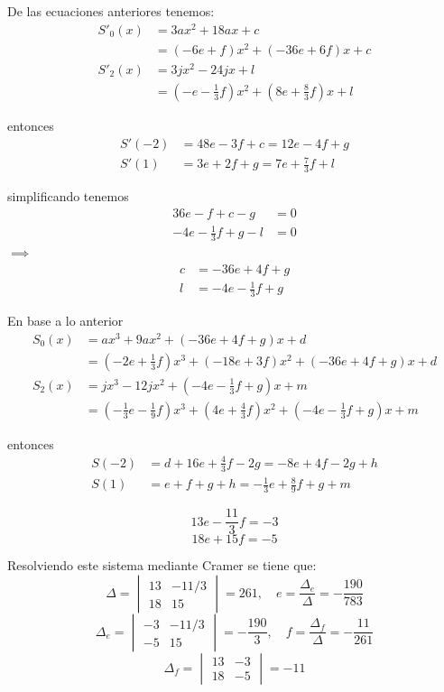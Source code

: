 \documentclass[11pt, oneside]{article}
\begin{document}
De las ecuaciones anteriores tenemos:
\begin{align*}
    S'_0(x) &= 3ax^2 + 18ax + c \\
    &= (-6e + f)x^2 + (-36e + 6f)x + c \\
    S'_2(x) &= 3jx^2 - 24jx + l \\
    &= (-e - \frac{1}{3}f)x^2 + (8e + \frac{8}{3}f)x + l
\end{align*}

entonces
\begin{align*}
    S'(-2) &= 48e - 3f + c = 12e - 4f + g \\
    S'(1) &= 3e + 2f + g = 7e + \frac{7}{3}f + l
\end{align*}

simplificando tenemos
\begin{align*}
    36e - f + c - g &= 0 \\
    -4e - \frac{1}{3}f + g - l &= 0
\end{align*}
$\implies$
\begin{align*}
    c &= -36e + 4f + g \\
    l &= -4e - \frac{1}{3}f + g
\end{align*}

En base a lo anterior
\begin{align*}
    S_0(x) &= ax^3 + 9ax^2 + (-36e + 4f + g)x + d \\
    &= (-2e + \frac{1}{3}f)x^3 + (-18e + 3f)x^2 + (-36e + 4f + g)x + d \\
    S_2(x) &= jx^3 - 12jx^2 + (-4e - \frac{1}{3}f + g)x + m \\
    &= (-\frac{1}{3}e - \frac{1}{9}f)x^3 + (4e + \frac{4}{3}f)x^2 + (-4e - \frac{1}{3}f + g)x + m
\end{align*}

entonces
\begin{align*}
    S(-2) &= d + 16e + \frac{4}{3}f - 2g = -8e + 4f - 2g + h \\
    S(1) &= e + f + g + h = -\frac{1}{3}e + \frac{8}{9}f + g + m
\end{align*}

\newpage

\[ 13e - \frac{11}{3}f = -3 \]
\[ 18e + 15f = -5 \]

Resolviendo este sistema mediante Cramer se tiene que:
\[ \Delta = \begin{vmatrix} 13 & -11/3 \\ 18 & 15 \end{vmatrix} = 261, \quad e = \frac{\Delta_e}{\Delta} = -\frac{190}{783} \]
\[ \Delta_e = \begin{vmatrix} -3 & -11/3 \\ -5 & 15 \end{vmatrix} = -\frac{190}{3}, \quad f = \frac{\Delta_f}{\Delta} = -\frac{11}{261} \]
\[ \Delta_f = \begin{vmatrix} 13 & -3 \\ 18 & -5 \end{vmatrix} = -11 \]
\end{document}
